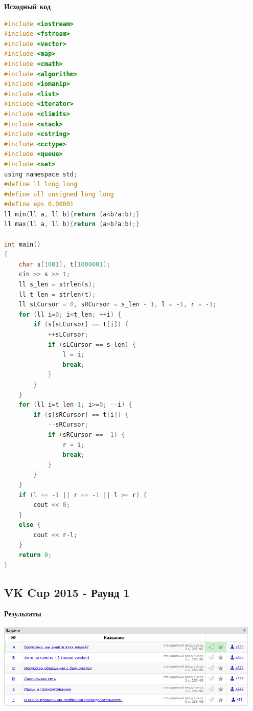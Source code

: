 \documentclass[a4paper,12pt]{article}
\begin{document}
\textbf{{\large Исходный код}} \\
\begin{lstlisting}[language=C]
#include <iostream>
#include <fstream>
#include <vector>
#include <map>
#include <cmath>
#include <algorithm>
#include <iomanip>
#include <list>
#include <iterator>
#include <climits>
#include <stack>
#include <cstring>
#include <cctype>
#include <queue>
#include <set>
using namespace std;
#define ll long long
#define ull unsigned long long
#define eps 0.00001
ll min(ll a, ll b){return (a<b?a:b);}
ll max(ll a, ll b){return (a>b?a:b);}

int main()
{
    char s[1001], t[1000001];
    cin >> s >> t;
    ll s_len = strlen(s);
    ll t_len = strlen(t);
    ll sLCursor = 0, sRCursor = s_len - 1, l = -1, r = -1;
    for (ll i=0; i<t_len; ++i) {
        if (s[sLCursor] == t[i]) {
            ++sLCursor;
            if (sLCursor == s_len) {
                l = i;
                break;
            }
        }
    }
    for (ll i=t_len-1; i>=0; --i) {
        if (s[sRCursor] == t[i]) {
            --sRCursor;
            if (sRCursor == -1) {
                r = i;
                break;
            }
        }
    }
    if (l == -1 || r == -1 || l >= r) {
        cout << 0;
    }
    else {
        cout << r-l;
    }
    return 0;
}
\end{lstlisting}

%
%

\newpage
\subsection{ VK Cup 2015 - Раунд 1}

\textbf{{\large Результаты}} \\
\begin{center}
\includegraphics[width=0.95\textwidth]{VK_R_1/A_VK_1_result.png}\\ [1cm]
\end{center}
\end{document}

